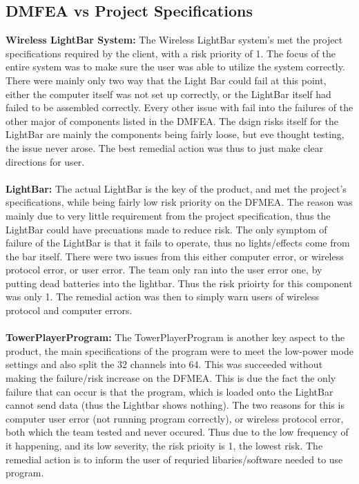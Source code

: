 \documentclass[12pt]{article}
\begin{document}
{{{{		\subsection{DMFEA vs Project Specifications}
			\textbf{Wireless LightBar System:} The Wireless LightBar system's met the project specifications required by the client, with a risk priority of 1. The focus of the entire system was to make sure the user was able to utilize the system correctly. There were mainly only two way that the Light Bar could fail at this point, either the computer itself was not set up correctly, or the LightBar itself had failed to be assembled correctly. Every other issue with fail into the failures of the other major of components listed in the DMFEA. The dsign risks itself for the LightBar are mainly the components being fairly loose, but eve thought testing, the issue never arose. The best remedial action was thus to just make clear directions for user.\\ \\
			\textbf{LightBar:} The actual LightBar is the key of the product, and met the project's specifications, while being fairly low risk priority on the DFMEA. The reason was mainly due to very little requirement from the project specification, thus the LightBar could have precuations made to reduce risk. The only symptom of failure of the LightBar is that it fails to operate, thus no lights/effects come from the bar itself. There were two issues from this either computer error, or wireless protocol error, or user error. The team only ran into the user error one, by putting dead batteries into the lightbar. Thus the risk prioirty for this component was only 1. The remedial action was then to simply warn users of wireless protocol and computer errors.\\ \\
			\textbf{TowerPlayerProgram:} The TowerPlayerProgram is another key aspect to the product, the main specifications of the program were to meet the low-power mode settings and also split the 32 channels into 64. This was succeeded without making the failure/risk increase on the DFMEA. This is due the fact the only failure that can occur is that the program, which is loaded onto the LightBar cannot send data (thus the Lightbar shows nothing). The two reasons for this is computer user error (not running program correctly), or wireless protocol error, both which the team tested and never occured. Thus due to the low frequency of it happening, and its low severity, the risk prioity is 1, the lowest risk. The remedial action is to inform the user of requried libaries/software needed to use program.\\ \\
}}}}
\end{document}
